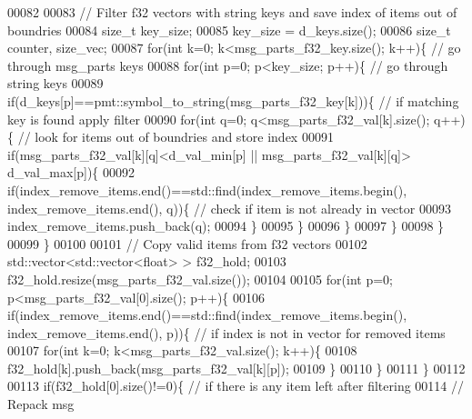 \begin{DoxyCode}
00082         
00083         \textcolor{comment}{// Filter f32 vectors with string keys and save index of items out of boundries}
00084         \textcolor{keywordtype}{size\_t} key\_size;
00085         key\_size = d_keys.size();
00086         \textcolor{keywordtype}{size\_t} counter, size\_vec;
00087         \textcolor{keywordflow}{for}(\textcolor{keywordtype}{int} k=0; k<msg\_parts\_f32\_key.size(); k++)\{ \textcolor{comment}{// go through msg\_parts keys}
00088             \textcolor{keywordflow}{for}(\textcolor{keywordtype}{int} p=0; p<key\_size; p++)\{ \textcolor{comment}{// go through string keys}
00089                 \textcolor{keywordflow}{if}(d_keys[p]==pmt::symbol\_to\_string(msg\_parts\_f32\_key[k]))\{ \textcolor{comment}{// if matching key is found
       apply filter}
00090                     \textcolor{keywordflow}{for}(\textcolor{keywordtype}{int} q=0; q<msg\_parts\_f32\_val[k].size(); q++)\{ \textcolor{comment}{// look for items out of boundries
       and store index}
00091                         \textcolor{keywordflow}{if}(msg\_parts\_f32\_val[k][q]<d_val_min[p] || msg\_parts\_f32\_val[k][q]>
      d_val_max[p])\{
00092                             \textcolor{keywordflow}{if}(index\_remove\_items.end()==std::find(index\_remove\_items.begin(), 
      index\_remove\_items.end(), q))\{ \textcolor{comment}{// check if item is not already in vector}
00093                                 index\_remove\_items.push\_back(q);
00094                             \}
00095                         \}
00096                     \}
00097                 \}
00098             \}
00099         \}
00100         
00101         \textcolor{comment}{// Copy valid items from f32 vectors}
00102         std::vector<std::vector<float> > f32\_hold;
00103         f32\_hold.resize(msg\_parts\_f32\_val.size());
00104         
00105         \textcolor{keywordflow}{for}(\textcolor{keywordtype}{int} p=0; p<msg\_parts\_f32\_val[0].size(); p++)\{
00106             \textcolor{keywordflow}{if}(index\_remove\_items.end()==std::find(index\_remove\_items.begin(), index\_remove\_items.end(), 
      p))\{ \textcolor{comment}{// if index is not in vector for removed items}
00107                 \textcolor{keywordflow}{for}(\textcolor{keywordtype}{int} k=0; k<msg\_parts\_f32\_val.size(); k++)\{
00108                     f32\_hold[k].push\_back(msg\_parts\_f32\_val[k][p]);
00109                 \}
00110             \}
00111         \}
00112         
00113         \textcolor{keywordflow}{if}(f32\_hold[0].size()!=0)\{ \textcolor{comment}{// if there is any item left after filtering}
00114             \textcolor{comment}{// Repack msg}

\end{DoxyCode}
